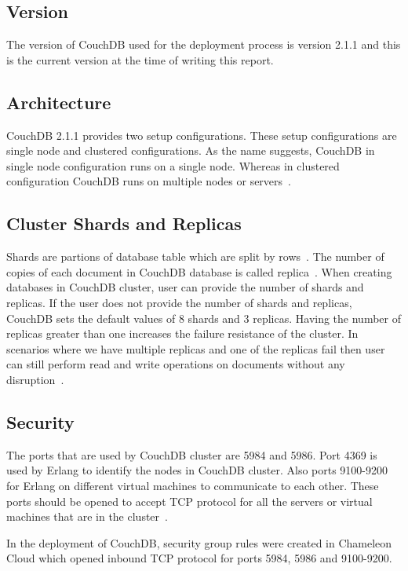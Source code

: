 \subsection{Version}
The version of CouchDB used for the deployment process is version 2.1.1 and this
is the current version at the time of writing this report.

\subsection{Architecture}
CouchDB 2.1.1 provides two setup configurations. These setup
configurations are single node and clustered configurations. As the
name suggests, CouchDB in single node configuration runs on a single
node. Whereas in clustered configuration CouchDB runs on multiple
nodes or servers~\cite{www-Couchdb, www-CouchdbOverview}.

\subsection{Cluster Shards and Replicas}

Shards are partions of database table which are split by
rows~\cite{www-WikiShard}. The number of copies of each document in
CouchDB database is called replica~\cite{www-CouchdbTheory}. When
creating databases in CouchDB cluster, user can provide the number of
shards and replicas. If the user does not provide the number of shards
and replicas, CouchDB sets the default values of 8 shards and 3
replicas. Having the number of replicas
greater than one increases the failure resistance of the cluster. In
scenarios where we have multiple replicas and one of the replicas fail
then user can still perform read and write operations on documents
without any disruption~\cite{www-CouchdbTheory}.

\subsection{Security}
The ports that are used by CouchDB cluster are 5984 and 5986. Port
4369 is used by Erlang to identify the nodes in CouchDB cluster. Also
ports 9100-9200 for Erlang on different virtual machines to communicate to each
other. These ports should be opened to accept TCP protocol for all the
servers or virtual machines that are in the
cluster~\cite{www-CouchdbSetup}. 

In the deployment of CouchDB, security group rules were
created in Chameleon Cloud which opened inbound TCP protocol for ports
5984, 5986 and 9100-9200.


